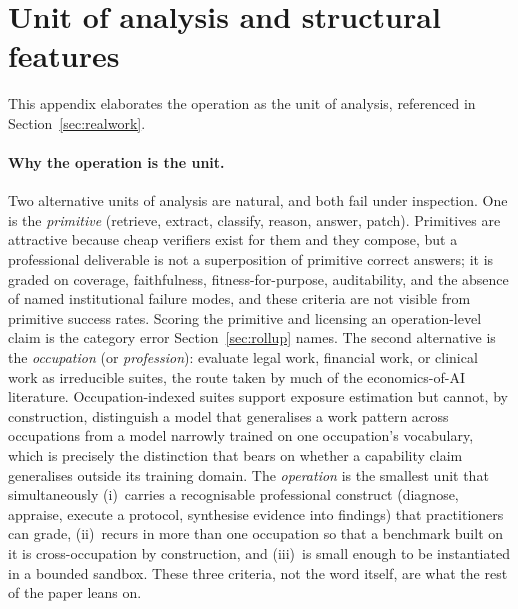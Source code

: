 \documentclass{article}
\begin{document}
\section{Unit of analysis and structural features}
\label{app:unit-features}

This appendix elaborates the operation as the unit of analysis, referenced in Section~\ref{sec:realwork}.

\paragraph{Why the operation is the unit.} Two alternative units of analysis are natural, and both fail under inspection.
One is the \emph{primitive} (retrieve, extract, classify, reason, answer, patch).
Primitives are attractive because cheap verifiers exist for them and they compose, but a professional deliverable is not a superposition of primitive correct answers; it is graded on coverage, faithfulness, fitness-for-purpose, auditability, and the absence of named institutional failure modes, and these criteria are not visible from primitive success rates.
Scoring the primitive and licensing an operation-level claim is the category error Section~\ref{sec:rollup} names.
The second alternative is the \emph{occupation} (or \emph{profession}): evaluate legal work, financial work, or clinical work as irreducible suites, the route taken by much of the economics-of-AI literature.
Occupation-indexed suites support exposure estimation but cannot, by construction, distinguish a model that generalises a work pattern across occupations from a model narrowly trained on one occupation's vocabulary, which is precisely the distinction that bears on whether a capability claim generalises outside its training domain.
The \emph{operation} is the smallest unit that simultaneously (i)~carries a recognisable professional construct (diagnose, appraise, execute a protocol, synthesise evidence into findings) that practitioners can grade, (ii)~recurs in more than one occupation so that a benchmark built on it is cross-occupation by construction, and (iii)~is small enough to be instantiated in a bounded sandbox.
These three criteria, not the word itself, are what the rest of the paper leans on.
\end{document}
